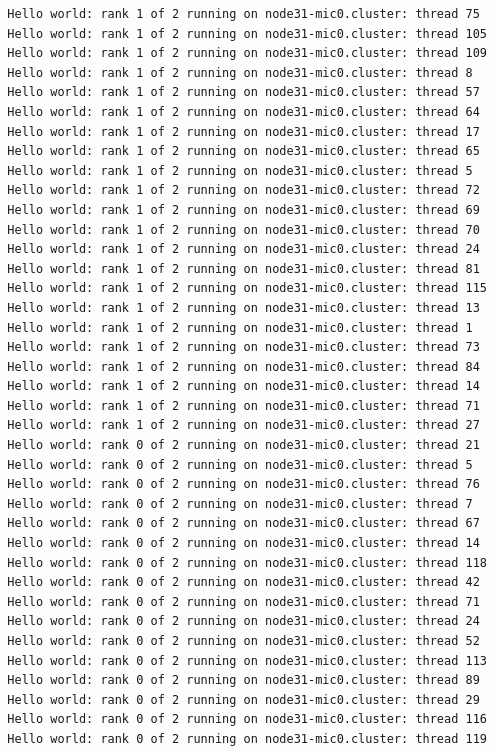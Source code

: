 \documentclass[pscyr,10pt]{hedlab}
\begin{document}
\begin{lstlisting}
  Hello world: rank 1 of 2 running on node31-mic0.cluster: thread 75
  Hello world: rank 1 of 2 running on node31-mic0.cluster: thread 105
  Hello world: rank 1 of 2 running on node31-mic0.cluster: thread 109
  Hello world: rank 1 of 2 running on node31-mic0.cluster: thread 8
  Hello world: rank 1 of 2 running on node31-mic0.cluster: thread 57
  Hello world: rank 1 of 2 running on node31-mic0.cluster: thread 64
  Hello world: rank 1 of 2 running on node31-mic0.cluster: thread 17
  Hello world: rank 1 of 2 running on node31-mic0.cluster: thread 65
  Hello world: rank 1 of 2 running on node31-mic0.cluster: thread 5
  Hello world: rank 1 of 2 running on node31-mic0.cluster: thread 72
  Hello world: rank 1 of 2 running on node31-mic0.cluster: thread 69
  Hello world: rank 1 of 2 running on node31-mic0.cluster: thread 70
  Hello world: rank 1 of 2 running on node31-mic0.cluster: thread 24
  Hello world: rank 1 of 2 running on node31-mic0.cluster: thread 81
  Hello world: rank 1 of 2 running on node31-mic0.cluster: thread 115
  Hello world: rank 1 of 2 running on node31-mic0.cluster: thread 13
  Hello world: rank 1 of 2 running on node31-mic0.cluster: thread 1
  Hello world: rank 1 of 2 running on node31-mic0.cluster: thread 73
  Hello world: rank 1 of 2 running on node31-mic0.cluster: thread 84
  Hello world: rank 1 of 2 running on node31-mic0.cluster: thread 14
  Hello world: rank 1 of 2 running on node31-mic0.cluster: thread 71
  Hello world: rank 1 of 2 running on node31-mic0.cluster: thread 27
  Hello world: rank 0 of 2 running on node31-mic0.cluster: thread 21
  Hello world: rank 0 of 2 running on node31-mic0.cluster: thread 5
  Hello world: rank 0 of 2 running on node31-mic0.cluster: thread 76
  Hello world: rank 0 of 2 running on node31-mic0.cluster: thread 7
  Hello world: rank 0 of 2 running on node31-mic0.cluster: thread 67
  Hello world: rank 0 of 2 running on node31-mic0.cluster: thread 14
  Hello world: rank 0 of 2 running on node31-mic0.cluster: thread 118
  Hello world: rank 0 of 2 running on node31-mic0.cluster: thread 42
  Hello world: rank 0 of 2 running on node31-mic0.cluster: thread 71
  Hello world: rank 0 of 2 running on node31-mic0.cluster: thread 24
  Hello world: rank 0 of 2 running on node31-mic0.cluster: thread 52
  Hello world: rank 0 of 2 running on node31-mic0.cluster: thread 113
  Hello world: rank 0 of 2 running on node31-mic0.cluster: thread 89
  Hello world: rank 0 of 2 running on node31-mic0.cluster: thread 29
  Hello world: rank 0 of 2 running on node31-mic0.cluster: thread 116
  Hello world: rank 0 of 2 running on node31-mic0.cluster: thread 119

\end{lstlisting}
\end{document}
